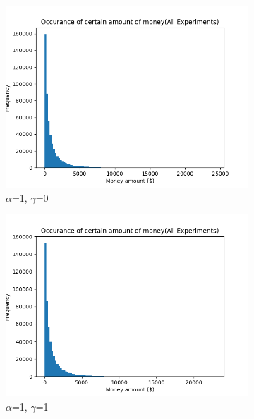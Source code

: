 \documentclass[12pt]{article} %
\begin{document}
\newcommand{\scaleResultsA}{0.5}
\newcommand{\scaleTextWidth}{0.5}
\begin{figure}[h!]
	\begin{subfigure}{\scaleTextWidth\textwidth}
		\includegraphics[scale=\scaleResultsA]{a1g0.png}
		\caption{$\alpha$=1, $\gamma$=0}
		\label{fig:a1g0}
	\end{subfigure}
	\begin{subfigure}{\scaleTextWidth\textwidth}
		\includegraphics[scale=\scaleResultsA]{a1g1.png}
		\caption{$\alpha$=1, $\gamma$=1}
		\label{fig:a1g1}
	\end{subfigure}\\[1ex] %
	\begin{subfigure}{\scaleTextWidth\textwidth}

\end{subfigure}
\end{figure}
\end{document}
